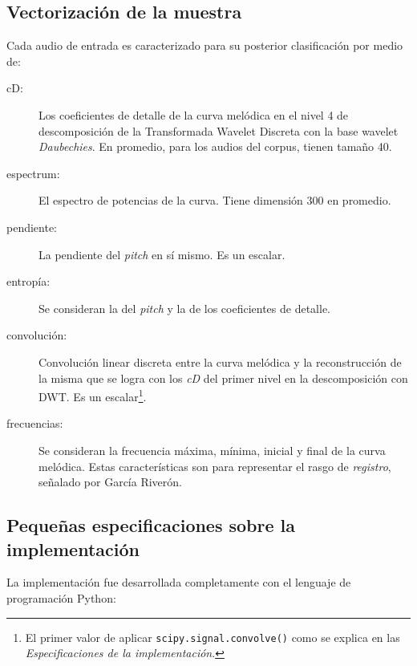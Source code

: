 \subsection{Vectorizaci\'on de la muestra}
Cada audio de entrada es caracterizado para su posterior clasificaci\'on por medio de:

\begin{description}
\item[cD:] Los coeficientes de detalle de la curva mel\'odica en el nivel 4 de descomposici\'on de la Transformada Wavelet Discreta con la base wavelet \emph{Daubechies}\cite{daubechies1992cbms}. En promedio, para los audios del corpus, tienen tama\~no 40.
\item[espectrum:] El espectro de potencias de la curva. Tiene dimensi\'on 300 en promedio.
\item[pendiente:] La pendiente del \emph{pitch} en s\'i mismo. Es un escalar.
\item[entrop\'ia:] Se consideran la del \emph{pitch} y la de los coeficientes de detalle.
\item[convoluci\'on:] Convoluci\'on linear discreta entre la curva mel\'odica y la reconstrucci\'on de la misma que se logra con los \emph{cD} del primer nivel en la descomposici\'on con DWT. Es un escalar\footnote{El primer valor de aplicar \texttt{scipy.signal.convolve()} como se explica en las \emph{Especificaciones de la implementaci\'on}.}.
\item[frecuencias:] Se consideran la frecuencia m\'axima, m\'inima, inicial y final de la curva mel\'odica. Estas caracter\'isticas son para representar el rasgo de \emph{registro}, se\~nalado por Garc\'ia River\'on.
\end{description}

\subsection{Peque\~nas especificaciones sobre la implementaci\'on}
La implementaci\'on fue desarrollada completamente con el lenguaje de programaci\'on Python:

